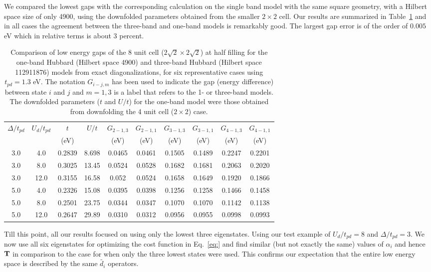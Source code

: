 We compared the lowest gaps with the corresponding calculation on the single 
band model with the same square geometry, with a Hilbert space size of only 4900, 
using the downfolded parameters obtained from the smaller $2 \times 2$ cell. Our results are summarized 
in Table~\ref{tab:predictivity} and in all cases the agreement between the three-band and one-band models 
is remarkably good. The largest gap error is of the order of $0.005$ eV which in relative terms is 
about 3 percent. 
\begin{table}[ht]
\centering
\begin{tabular}{c|c|c|c||c|c||c|c||c|c}
\hline
$\Delta/t_{pd}$ & $U_d/t_{pd}$ & $t$ & $U/t$ & $G_{2-1,3}$ & $G_{2-1,1}$ & $G_{3-1,3}$ & $G_{3-1,1}$ & $G_{4-1,3}$ & $G_{4-1,1}$  \\
                &              & (eV)&       & (eV)        & (eV)        & (eV)        & (eV)        & (eV)        & (eV)         \\
\hline
\hline
3.0 & 4.0 &  0.2839 & 8.698 & 0.0465 & 0.0461 & 0.1505 & 0.1489 & 0.2247 & 0.2201  \\ 
3.0 & 8.0 &  0.3025 & 13.45 & 0.0524 & 0.0528 & 0.1682 & 0.1681 & 0.2063 & 0.2020  \\ 
3.0 & 12.0 & 0.3155 & 16.58 & 0.052 & 0.0524 & 0.1658 & 0.1649 & 0.1920 & 0.1866  \\ 
5.0 & 4.0 &  0.2326 & 15.08 & 0.0395 & 0.0398 & 0.1256 & 0.1258 & 0.1466 & 0.1458  \\ 
5.0 & 8.0 &  0.2501 & 23.75 & 0.0344 & 0.0347 & 0.1070 & 0.1070 & 0.1142 & 0.1138  \\ 
5.0 & 12.0 & 0.2647 &29.89 & 0.0310 & 0.0312 & 0.0956 & 0.0955 & 0.0998 & 0.0993  \\ 
\hline
\end{tabular}
\caption{Comparison of low energy gaps of the 8 unit cell ($2\sqrt{2} \times 2\sqrt{2}$) at half filling for the 
one-band Hubbard (Hilbert space 4900) and three-band Hubbard (Hilbert space 112911876) 
models from exact diagonalizations, for six representative cases using $t_{pd}=1.3 $ eV. The notation $G_{i-j,m}$ 
has been used to indicate the gap (energy difference) between state $i$ and $j$ and $m=1,3$ is a label that 
refers to the 1- or three-band models. 
The downfolded parameters ($t$ and $U/t$) 
for the one-band model were those obtained from downfolding the 4 unit cell ($2\times2$) case.}
\label{tab:predictivity}
\end{table} 

Till this point, all our results focused on using only the lowest three eigenstates. 
Using our test example of $U_d/t_{pd}=8$ and $\Delta/t_{pd}=3$. We now use all six eigenstates 
for optimizing the cost function in Eq.~\ref{eq:} and find similar (but not exactly the same) 
values of $\alpha_i$ and hence ${\bf T}$ in comparison to the case for when only the three lowest states were 
used. This confirms our expectation that the entire low energy space is described by the same 
$\tilde{d_i}$ operators. 

